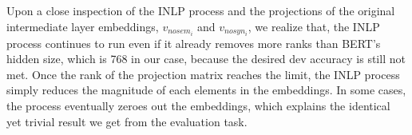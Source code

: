 \documentclass[11pt,a4paper]{article}
\begin{document}
Upon a close inspection of the INLP process and the projections of the original intermediate layer embeddings, $v_{nosem_i}$ and $v_{nosyn_i}$, we realize that, the INLP process continues to run even if it already removes more ranks than BERT’s hidden size, which is 768 in our case, because the desired dev accuracy is still not met. Once the rank of the projection matrix reaches the limit, the INLP process simply reduces the magnitude of each elements in the embeddings. In some cases, the process eventually zeroes out the embeddings, which explains the identical yet trivial result we get from the evaluation task.


\end{document}

